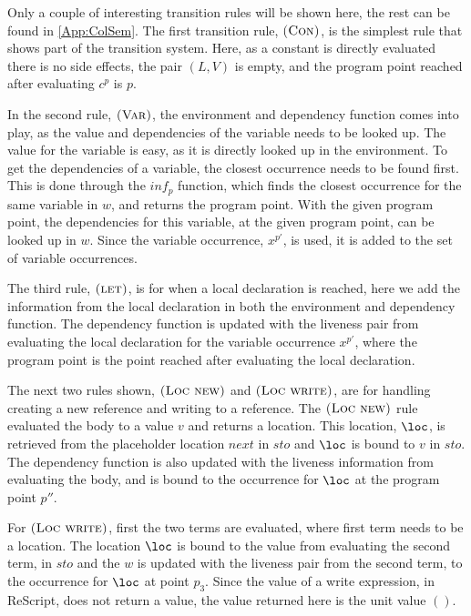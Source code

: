 \documentclass[../../master.tex]{subfiles}
\begin{document}
Only a couple of interesting transition rules will be shown here, the rest can be found in \cref{App:ColSem}.
The first transition rule, $\textsc{(Con)}$, is the simplest rule that shows part of the transition system.
Here, as a constant is directly evaluated there is no side effects, the pair $(L,V)$ is empty, and the program point reached after evaluating $c^p$ is $p$.

In the second rule, $\textsc{(Var)}$, the environment and dependency function comes into play, as the value and dependencies of the variable needs to be looked up.
The value for the variable is easy, as it is directly looked up in the environment.
To get the dependencies of a variable, the closest occurrence needs to be found first.
This is done through the $inf_p$ function, which finds the closest occurrence for the same variable in $w$, and returns the program point.
With the given program point, the dependencies for this variable, at the given program point, can be looked up in $w$.
Since the variable occurrence, $x^{p'}$, is used, it is added to the set of variable occurrences.

The third rule, $\textsc{(let)}$, is for when a local declaration is reached, here we add the information from the local declaration in both the environment and dependency function.
The dependency function is updated with the liveness pair from evaluating the local declaration for the variable occurrence $x^{p'}$, where the program point is the point reached after evaluating the local declaration.

The next two rules shown, $\textsc{(Loc new)}$ and $\textsc{(Loc write)}$, are for handling creating a new reference and writing to a reference.
The $\textsc{(Loc new)}$ rule evaluated the body to a value $v$ and returns a location.
This location, $\loc$, is retrieved from the placeholder location $next$ in $sto$ and $\loc$ is bound to $v$ in $sto$.
The dependency function is also updated with the liveness information from evaluating the body, and is bound to the occurrence for $\loc$ at the program point $p''$.

For $\textsc{(Loc write)}$, first the two terms are evaluated, where first term needs to be a location.
The location $\loc$ is bound to the value from evaluating the second term, in $sto$ and the $w$ is updated with the liveness pair from the second term, to the occurrence for $\loc$ at point $p_3$.
Since the value of a write expression, in ReScript, does not return a value, the value returned here is the unit value $()$.
\end{document}
